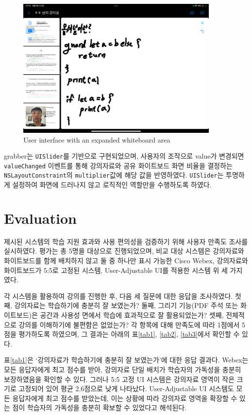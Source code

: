 \documentclass[pdflatex,sn-mathphys-num]{sn-jnl}%
\theoremstyle{thmstyleone}%
\theoremstyle{thmstyletwo}%
\theoremstyle{thmstylethree}%
\begin{document}
\begin{figure}[H]
\centering
\includegraphics[width=0.9\textwidth]{UserInterfaceWithAnExpandedWhiteboardArea.PNG}
\caption{User interface with an expanded whiteboard area}\label{fig8}
\end{figure}

\noindent
grabber는 \verb+UISlider+를 기반으로 구현되었으며, 사용자의 조작으로 value가 변경되면 \verb+valueChanged+ 이벤트를 통해 강의자료와 공유 화이트보드 화면 비율을 결정하는 \verb+NSLayoutConstraint+의 \verb+multiplier+값에 해당 값을 반영하였다. \verb+UISlider+는 투명하게 설정하여 화면에 드러나지 않고 로직적인 역할만을 수행하도록 하였다.

\section{Evaluation}\label{sec4}

제시된 시스템의 학습 지원 효과와 사용 편의성을 검증하기 위해 사용자 만족도 조사를 실시하였다. 평가는 총 5명을 대상으로 진행되었으며, 비교 대상 시스템은 강의자료와 화이트보드를 함께 배치하지 않고 둘 중 하나만 표시 가능한 Cisco Webex, 강의자료와 화이트보드가 5:5로 고정된 시스템, User-Adjustable UI를 적용한 시스템 위 세 가지였다.

각 시스템을 활용하여 강의를 진행한 후, 다음 세 질문에 대한 응답을 조사하였다. 첫째, 강의자료는 학습하기에 충분히 잘 보였는가? 둘째, 그리기 기능(PDF 주석 또는 화이트보드)은 공간과 사용성 면에서 학습에 효과적으로 잘 활용되었는가? 셋째, 전체적으로 강의를 이해하기에 불편함은 없었는가? 각 항목에 대해 만족도에 따라 1점에서 5점을 평가하도록 하였으며, 그 결과는 아래의 표\ref{tab1}, \ref{tab2}, \ref{tab3}에서 확인할 수 있다.

표\ref{tab1}은 `강의자료가 학습하기에 충분히 잘 보였는가'에 대한 응답 결과다. Webex는 모든 응답자에게 최고 점수를 받아, 강의자료 단일 배치가 학습자의 가독성을 충분히 보장하였음을 확인할 수 있다. 그러나 5:5 고정 UI 시스템은 강의자료 영역이 작은 크기로 고정되어 있어 평균 2.6점으로 낮게 나타났다. User-Adjustable UI 시스템도 모든 응답자에게 최고 점수를 받았는데, 이는 상황에 따라 강의자료 영역을 확장할 수 있는 점이 학습자의 가독성을 충분히 확보할 수 있었다고 해석된다.
\end{document}
